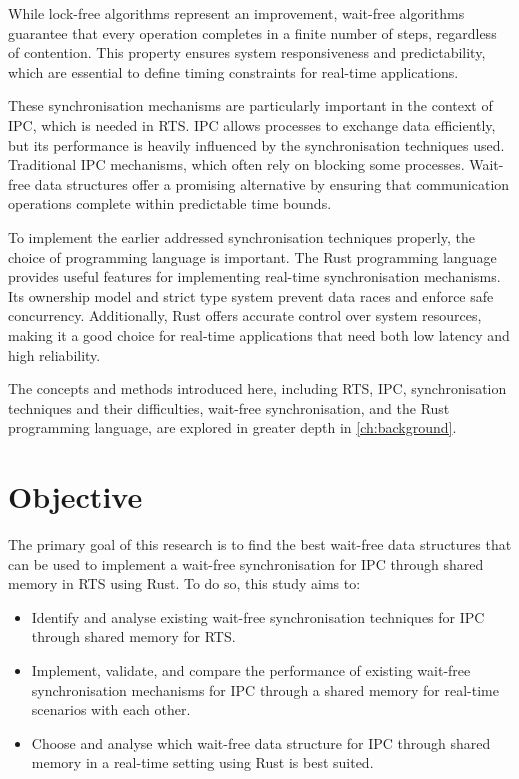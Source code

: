 While lock-free algorithms represent an improvement, wait-free algorithms guarantee that every operation completes in a finite number of steps, regardless of contention. This property ensures system responsiveness and predictability, which are essential to define timing constraints for real-time applications. \cite{kogan2012methodology, herlihy1991wait, brandenburg2019multiprocessorrealtimelockingprotocols}

These synchronisation mechanisms are particularly important in the context of \ac{IPC}, which is needed in \ac{RTS}. \ac{IPC} allows processes to exchange data efficiently, but its performance is heavily influenced by the synchronisation techniques used. Traditional \ac{IPC} mechanisms, which often rely on blocking some processes. Wait-free data structures offer a promising alternative by ensuring that communication operations complete within predictable time bounds. \cite{timnat2014practical, michael1996simple, huang2002improvingWaitFree, pellegrini2020relevancewaitfreecoordinationalgorithms}

To implement the earlier addressed synchronisation techniques properly, the choice of programming language is important. The Rust programming language provides useful features for implementing real-time synchronisation mechanisms. Its ownership model and strict type system prevent data races and enforce safe concurrency. Additionally, Rust offers accurate control over system resources, making it a good choice for real-time applications that need both low latency and high reliability. \cite{xu2023rust, sharma2024rustembeddedsystemscurrent}

The concepts and methods introduced here, including \ac{RTS}, \ac{IPC}, synchronisation techniques and their difficulties, wait-free synchronisation, and the Rust programming language, are explored in greater depth in \cref{ch:background}. 

\section{Objective}\label{sec:objective}
The primary goal of this research is to find the best wait-free data structures that can be used to implement a wait-free synchronisation for \ac{IPC} through shared memory in \ac{RTS} using Rust. To do so, this study aims to:

\begin{itemize}
\item Identify and analyse existing wait-free synchronisation techniques for \ac{IPC} through shared memory for \ac{RTS}.
\item Implement, validate, and compare the performance of existing wait-free synchronisation mechanisms for \ac{IPC} through a shared memory for real-time scenarios with each other.
\item Choose and analyse which wait-free data structure for \ac{IPC} through shared memory in a real-time setting using Rust is best suited.
\end{itemize}


